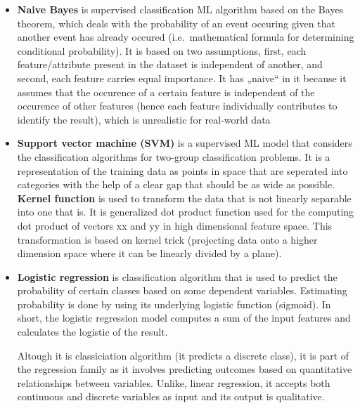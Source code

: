 \documentclass[
  letterpaper,
  DIV=11,
  numbers=noendperiod]{scrreprt}
\begin{document}
\begin{itemize}
  \begin{itemize}
  \item
    \textbf{Naive Bayes} is supervised classification ML algorithm based
    on the Bayes theorem, which deals with the probability of an event
    occuring given that another event has already occured
    (i.e.~mathematical formula for determining conditional probability).
    It is based on two assumptions, first, each feature/attribute
    present in the dataset is independent of another, and second, each
    feature carries equal importance. It has „naive`` in it because it
    assumes that the occurence of a certain feature is independent of
    the occurence of other features (hence each feature individually
    contributes to identify the result), which is unrealistic for
    real-world data
  \item
    \textbf{Support vector machine (SVM)} is a supervised ML model that
    considers the classification algorithms for two-group classification
    problems. It is a representation of the training data as points in
    space that are seperated into categories with the help of a clear
    gap that should be as wide as possible. \textbf{Kernel function} is
    used to transform the data that is not linearly separable into one
    that is. It is generalized dot product function used for the
    computing dot product of vectors xx and yy in high dimensional
    feature space. This transformation is based on kernel trick
    (projecting data onto a higher dimension space where it can be
    linearly divided by a plane).
  \item
    \textbf{Logistic regression} is classification algorithm that is
    used to predict the probability of certain classes based on some
    dependent variables. Estimating probability is done by using its
    underlying logistic function (sigmoid). In short, the logistic
    regression model computes a sum of the input features and calculates
    the logistic of the result.

    Altough it is classiciation algorithm (it predicts a discrete
    class), it is part of the regression family as it involves
    predicting outcomes based on quantitative relationships between
    variables. Unlike, linear regression, it accepts both continuous and
    discrete variables as input and its output is qualitative.


\end{itemize}
\end{itemize}
\end{document}
